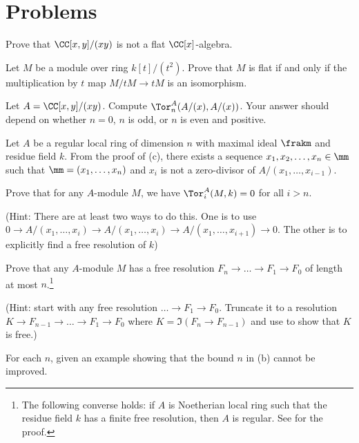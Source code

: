 \section{Problems}
\begin{problem}
\label{prob:not_flat_example}
Prove that $\CC[x,y]/(xy)$ is not a flat $\CC[x]$-algebra.
\end{problem}
\begin{problem}
Let $M$ be a module over ring $k[t]/(t^2)$.
Prove that $M$ is flat if and only if the multiplication by $t$ map
$M/tM \to tM$ is an isomorphism.
\end{problem}
\begin{problem}
Let $A=\CC[x,y]/(xy)$. Compute $\Tor_n^A(A/(x), A/(x))$.
Your answer should depend on whether $n=0$, $n$ is odd,
or $n$ is even and positive.
\end{problem}
\begin{problem}
Let $A$ be a regular local ring of dimension $n$ with maximal ideal $\frakm$
and residue field $k$.
From the proof of  (c), 
there exists a sequence $x_1,x_2,\dots,x_n\in \mm$ 
such that $\mm = (x_1,\dots,x_n)$ and 
$x_i$ is not a zero-divisor of $A/(x_1,\dots,x_{i-1})$.
\begin{alphenum}
\item Prove that for any $A$-module $M$, we have 
$\Tor^A_i(M,k) = 0$ for all $i>n$.

(Hint: There are at least two ways to do this.
One is to use $0\to A/(x_1,\dots,x_i) \to A/(x_1,\dots,x_i)
\to A/(x_1,\dots,x_{i+1})\to 0$.
The other is to explicitly find a free resolution of $k$)
\item Prove that any $A$-module $M$ 
has a free resolution $F_n\to \dots \to F_1\to F_0$
of length at most $n$.\footnote{The following converse holds:
if $A$ is Noetherian local ring such that the residue field $k$
has a finite free resolution, then $A$ is regular.
See \cite[Theorem 19.12]{eisenbud} for the proof.}

(Hint: start with any free resolution $\dots \to F_1\to F_0$.
Truncate it to a resolution $K\to F_{n-1}\to\dots\to F_1\to F_0$
where $K=\Im(F_n\to F_{n-1})$
and use  to show that $K$ is free.)
\item For each $n$, given an example showing that the bound $n$ in (b) cannot be improved.
\end{alphenum}
\end{problem}